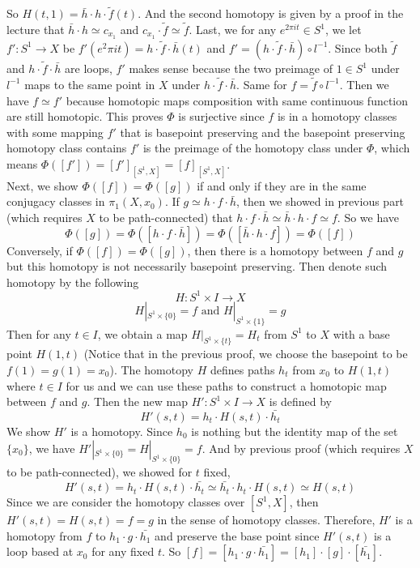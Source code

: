 \documentclass[12pt]{amsart}
\begin{document}
So $H(t,1)=\bar{h}\cdot h\cdot \tilde{f}(t)$. And the second homotopy is given by a proof in the lecture that $\bar{h}\cdot h\simeq c_{x_1}$ and $c_{x_1}\cdot \tilde{f} \simeq \tilde{f}$. Last, we for any $e^{2\pi it}\in S^1$, we let $f':S^1\rightarrow X$ be $f'(e^2\pi it)=h\cdot \tilde{f}\cdot \bar{h}(t)$ and $f'=(h\cdot \tilde{f}\cdot \bar{h})\circ l^{-1}$. Since both $\tilde{f}$ and $h\cdot \tilde{f}\cdot \bar{h}$ are loops, $f'$ makes sense because the two preimage of $1\in S^1$ under $l^{-1}$ maps to the same point in $X$ under $h\cdot \tilde{f}\cdot \bar{h}$. Same for $f=\tilde{f}\circ l^{-1}$. Then we have $f\simeq f'$ because homotopic maps composition with same continuous function are still homotopic. This proves $\Phi$ is surjective since $f$ is in a homotopy classes with some mapping $f'$ that is basepoint preserving and the basepoint preserving homotopy class contains $f'$ is the preimage of the homotopy class under $\Phi$, which means $\Phi([f'])=[f']_{[S^1,X]}=[f]_{[S^1,X]}$.\\
Next, we show $\Phi([f])=\Phi([g])$ if and only if they are in the same conjugacy classes in $\pi_1(X,x_0)$. If $g\simeq h\cdot f \cdot \bar{h}$, then we showed in previous part (which requires $X$ to be path-connected) that $ h\cdot f\cdot \bar{h}\simeq \bar{h}\cdot h\cdot f\simeq f$. So we have
\[\Phi([g])=\Phi([h\cdot f \cdot \bar{h}])=\Phi([\bar{h}\cdot h\cdot f])=\Phi([f])\]
Conversely, if $\Phi([f])=\Phi([g])$, then there is a homotopy between $f$ and $g$ but this homotopy is not necessarily basepoint preserving. Then denote such homotopy by the following
\[H:S^1\times I \rightarrow X\]
\[H|_{S^1\times \{0\}}=f \text{ and }H|_{S^1\times \{1\}}=g\]
Then for any $t\in I$, we obtain a map $H|_{S^1\times \{t\}}=H_t$ from $S^1$ to $X$ with a base point $H(1,t)$ (Notice that in the previous proof, we choose the basepoint to be $f(1)=g(1)=x_0$). The homotopy $H$ defines paths $h_t$ from $x_0$ to $H(1,t)$ where $t\in I$ for us and we can use these paths to construct a homotopic map between $f$ and $g$. Then the new map $H':S^1\times I \rightarrow X$ is defined by
\[H'(s,t)=h_t\cdot H(s,t)\cdot \bar{h_t}\]
We show $H'$ is a homotopy. Since $h_0$ is nothing but the identity map of the set $\{x_0\}$, we have $H'|_{S^1\times \{0\}}=H|_{S^1\times \{0\}}=f$. And by previous proof (which requires $X$ to be path-connected), we showed for $t$ fixed,
\[H'(s,t)=h_t\cdot H(s,t)\cdot \bar{h_t}\simeq \bar{h_t} \cdot h_t\cdot H(s,t)\simeq H(s,t) \]
Since we are consider the homotopy classes over $[S^1,X]$, then $H'(s,t)=H(s,t)=f=g$ in the sense of homotopy classes. Therefore, $H'$ is a homotopy from $f$ to $h_1\cdot g\cdot \bar{h_1}$ and preserve the base point since $H'(s,t)$ is a loop based at $x_0$ for any fixed $t$. So $[f]=[h_1\cdot g\cdot \bar{h_1}]=[h_1]\cdot [g]\cdot [\bar{h_1}]$.
\end{document}
